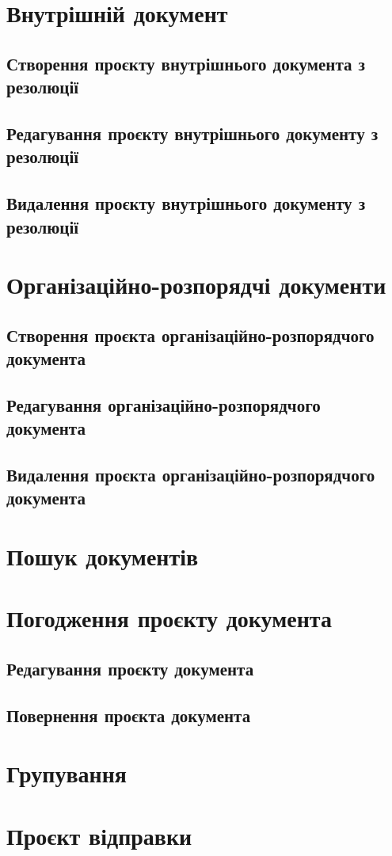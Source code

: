 \section{Внутрішній документ}

\subsection{Створення проєкту внутрішнього документа з резолюції}

\subsection{Редагування проєкту внутрішнього документу з резолюції}

\subsection{Видалення проєкту внутрішнього документу з резолюції}

\section{Організаційно-розпорядчі документи}

\subsection{Створення проєкта організаційно-розпорядчого документа}

\subsection{Редагування організаційно-розпорядчого документа}

\subsection{Видалення проєкта організаційно-розпорядчого документа}

\section{Пошук документів}

\section{Погодження проєкту документа}

\subsection{Редагування проєкту документа}

\subsection{Повернення проєкта документа}

\section{Групування}

\section{Проєкт відправки}

